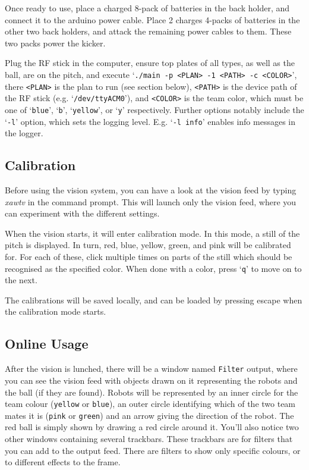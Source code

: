 \documentclass[a4paper,12pt]{scrartcl}
\begin{document}
Once ready to use, place a charged 8-pack of batteries in the back holder, and
connect it to the arduino power cable. Place 2 charges 4-packs of batteries in
the other two back holders, and attack the remaining power cables to them.
These two packs power the kicker.

Plug the RF stick in the computer, ensure top plates of all types, as well as
the ball, are on the pitch, and execute
`\texttt{./main -p <PLAN> -1 <PATH> -c <COLOR>}', there \texttt{<PLAN>} is the
plan to run (see section below), \texttt{<PATH>} is the device path of the RF
stick (e.g. `\verb$/dev/ttyACM0$'), and \texttt{<COLOR>} is the team color,
which must be one of `\texttt{blue}', `\texttt{b}', `\texttt{yellow}', or
`\texttt{y}' respectively. Further options notably include the `\texttt{-l}'
option, which sets the logging level. E.g. `\texttt{-l info}' enables info
messages in the logger.

\subsection{Calibration}

Before using the vision system, you can have a look at the vision feed by typing \emph{xawtv} in the command prompt. This will launch only the vision feed, where you can experiment with the different settings.

When the vision starts, it will enter calibration mode. In this mode, a still
of the pitch is displayed. In turn, red, blue, yellow, green, and pink will be
calibrated for. For each of these, click multiple times on parts of the still
which should be recognised as the specified color. When done with a color,
press `\texttt{q}' to move on to the next.

The calibrations will be saved locally, and can be loaded by pressing escape
when the calibration mode starts.

\subsection{Online Usage}

After the vision is lunched, there will be a window named \texttt{Filter} output, where you can see the vision feed with objects drawn on it representing the robots and the ball (if they are found).
Robots will be represented by an inner circle for the team colour (\texttt{yellow} or \texttt{blue}), an outer circle identifying which of the two team mates it is (\texttt{pink} or \texttt{green}) and an arrow giving the direction of the robot. The red ball is simply shown by drawing a red circle around it. You'll also notice two other windows containing several trackbars.
These trackbars are for filters that you can add to the output feed. There are filters to show only specific colours, or to different effects to the frame.
\end{document}
